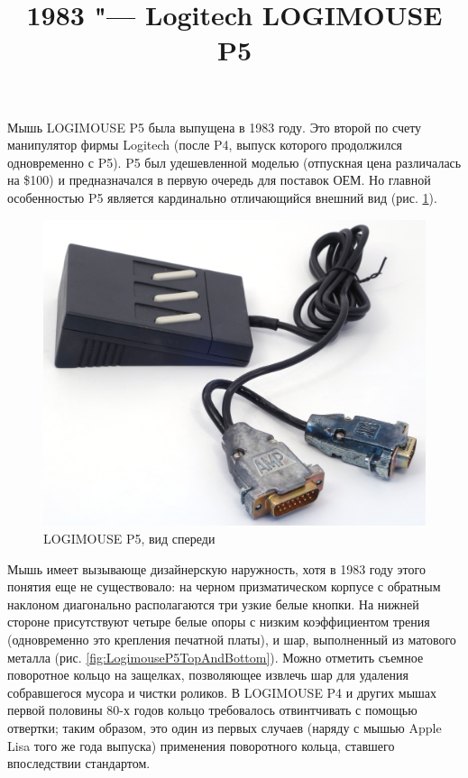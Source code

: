 \documentclass[11pt, a4paper]{article}
\begin{document}
\title{1983 "--- Logitech LOGIMOUSE P5}
\date{}
\maketitle

Мышь LOGIMOUSE P5 была выпущена в 1983 году. Это второй по счету манипулятор фирмы Logitech (после P4, выпуск которого продолжился одновременно с P5). P5 был удешевленной моделью (отпускная цена различалась на \$100) и предназначался в первую очередь для поставок ОЕМ.
Но главной особенностью P5 является кардинально отличающийся внешний вид (рис. \ref{fig:LogimouseP5Pic}). 

\begin{figure}[h]
   \centering
    \includegraphics[scale=0.35]{1983_logitech_logimouse_p5/pic_30.jpg}
    \caption{LOGIMOUSE P5, вид спереди}
    \label{fig:LogimouseP5Pic}
\end{figure}

Мышь имеет вызывающе дизайнерскую наружность, хотя в 1983 году этого понятия еще не существовало: на черном призматическом корпусе с обратным наклоном диагонально располагаются три узкие белые кнопки. На нижней стороне присутствуют четыре белые опоры с низким коэффициентом трения (одновременно это крепления печатной платы), и шар, выполненный из матового металла (рис. \ref{fig:LogimouseP5TopAndBottom}). Можно отметить съемное поворотное кольцо на защелках, позволяющее извлечь шар для удаления собравшегося мусора и чистки роликов. В LOGIMOUSE P4 и других мышах первой половины 80-х годов кольцо требовалось отвинтчивать с помощью отвертки; таким образом, это один из первых случаев (наряду с мышью Apple Lisa того же года выпуска) применения поворотного кольца, ставшего впоследствии стандартом.
\end{document}
